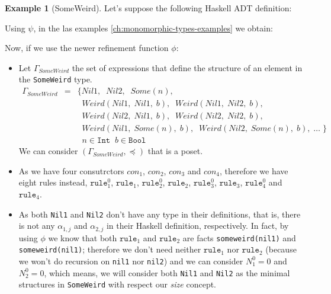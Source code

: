 \documentclass{report}
\theoremstyle{definition}
\newtheorem{example}{Example}[section]
\theoremstyle{definition}
\newcommand{\ttt}[1]{\texttt{#1}}
\newcommand{\tav}{\;\;}
\begin{document}
	\begin{example}[SomeWeird]
		Let's suppose the following Haskell ADT definition:
		
		Using $\psi$, in the las examples \ref{ch:monomorphic-types-examples} we obtain:
		
		Now, if we use the newer refinement function $\phi$:
		\begin{itemize}
			\item Let $\Gamma_{SomeWeird}$ the set of expressions that define the structure of an element in the \ttt{SomeWeird} type.
			      \begin{eqnarray*}
			      	\Gamma_{SomeWeird} & = & \{ Nil1, \tav Nil2, \tav Some(n), \\
			      	&& \tav Weird(Nil1, \; Nil1, \; b), \tav Weird(Nil1, \; Nil2, \; b), \\
			      	&& \tav Weird(Nil2, \; Nil1, \; b), \tav Weird(Nil2, \; Nil2, \; b),  \\
			      	&& \tav Weird(Nil1, \; Some(n), \; b), \tav Weird(Nil2, \; Some(n), \; b), \; \ldots \; \} \\
			      	&& \tav n \in \ttt{Int} \tav b \in \ttt{Bool}
			      \end{eqnarray*}
			      We can consider $(\Gamma_{SomeWeird}, \preceq)$ that is a poset.
			\item As we have four consutrctors $con_1$, $con_2$, $con_3$ and $con_4$, therefore we have eight rules instead, $\ttt{rule}_{1}^{0}$, $\ttt{rule}_1$, $\ttt{rule}_{2}^{0}$, $\ttt{rule}_2$, $\ttt{rule}_{3}^{0}$, $\ttt{rule}_3$, $\ttt{rule}_{4}^{0}$ and $\ttt{rule}_4$.
			\item As both \ttt{Nil1} and \ttt{Nil2} don't have any type in their definitions, that is, there is not any $\alpha_{1,j}$ and $\alpha_{2,j}$ in their Haskell definition, respectively. In fact, by using $\phi$ we know that both $\ttt{rule}_1$ and $\ttt{rule}_2$ are facts \ttt{someweird(nil1)} and \ttt{someweird(nil1)}; therefore we don't need neither $\ttt{rule}_1$ nor $\ttt{rule}_2$ (because we won't do recursion on \ttt{nil1} nor \ttt{nil2}) and we can consider $N_{1}^{0} = 0$ and $N_{2}^{0} = 0$, which means, we will consider both \ttt{Nil1} and \ttt{Nil2} as the minimal structures in \ttt{SomeWeird} with respect our \textit{size} concept.\\\\

\end{itemize}
\end{example}
\end{document}
